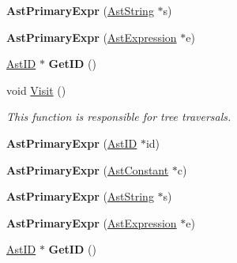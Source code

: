 \begin{DoxyCompactItemize}
\item 
\hypertarget{classAstPrimaryExpr_a784c92261d262fe4952963af0dd891e7}{{\bfseries Ast\-Primary\-Expr} (\hyperlink{classAstString}{Ast\-String} $\ast$s)}\label{classAstPrimaryExpr_a784c92261d262fe4952963af0dd891e7}

\item 
\hypertarget{classAstPrimaryExpr_a75b1363ac6a376ea3de63e03700072d8}{{\bfseries Ast\-Primary\-Expr} (\hyperlink{classAstExpression}{Ast\-Expression} $\ast$e)}\label{classAstPrimaryExpr_a75b1363ac6a376ea3de63e03700072d8}

\item 
\hypertarget{classAstPrimaryExpr_a0c5a0ec5399baf9dd319ba0f77e9111e}{\hyperlink{classAstID}{Ast\-I\-D} $\ast$ {\bfseries Get\-I\-D} ()}\label{classAstPrimaryExpr_a0c5a0ec5399baf9dd319ba0f77e9111e}

\item 
void \hyperlink{classAstPrimaryExpr_adfc316933183cada2963b7b855ddb824}{Visit} ()
\begin{DoxyCompactList}\small\item\em This function is responsible for tree traversals. \end{DoxyCompactList}\item 
\hypertarget{classAstPrimaryExpr_a92ac6a98d42e522c7476768c959e2044}{{\bfseries Ast\-Primary\-Expr} (\hyperlink{classAstID}{Ast\-I\-D} $\ast$id)}\label{classAstPrimaryExpr_a92ac6a98d42e522c7476768c959e2044}

\item 
\hypertarget{classAstPrimaryExpr_a03809c945a11ab5345f50956cff84f82}{{\bfseries Ast\-Primary\-Expr} (\hyperlink{classAstConstant}{Ast\-Constant} $\ast$c)}\label{classAstPrimaryExpr_a03809c945a11ab5345f50956cff84f82}

\item 
\hypertarget{classAstPrimaryExpr_a784c92261d262fe4952963af0dd891e7}{{\bfseries Ast\-Primary\-Expr} (\hyperlink{classAstString}{Ast\-String} $\ast$s)}\label{classAstPrimaryExpr_a784c92261d262fe4952963af0dd891e7}

\item 
\hypertarget{classAstPrimaryExpr_a75b1363ac6a376ea3de63e03700072d8}{{\bfseries Ast\-Primary\-Expr} (\hyperlink{classAstExpression}{Ast\-Expression} $\ast$e)}\label{classAstPrimaryExpr_a75b1363ac6a376ea3de63e03700072d8}

\item 
\hypertarget{classAstPrimaryExpr_a0c5a0ec5399baf9dd319ba0f77e9111e}{\hyperlink{classAstID}{Ast\-I\-D} $\ast$ {\bfseries Get\-I\-D} ()}\label{classAstPrimaryExpr_a0c5a0ec5399baf9dd319ba0f77e9111e}


\end{DoxyCompactItemize}
